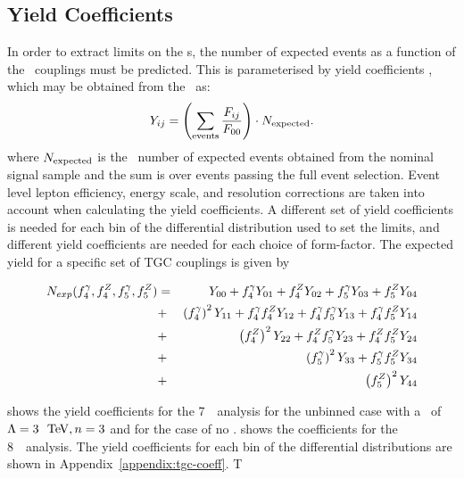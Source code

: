 \subsection{Yield Coefficients}

In order to extract limits on the \TGC s, the number of expected events as a
function of the \TGC\ couplings must be predicted. This is parameterised by
yield coefficients \Yij, which may be obtained from the \Fij\ as:
\begin{equation}
Y_{ij} = \left( \sum_{\rm events} \frac{F_{ij}}{F_{00} } \right) \cdot{N_{\rm expected}}.
\end{equation}
where $N_{\rm expected}$ is the \sm\ number of expected events obtained from the
nominal signal sample and the sum is over events passing the full event
selection. Event level lepton efficiency, energy scale, and resolution corrections
are taken into account when calculating the yield coefficients. A different set of yield
coefficients is needed for each bin of the differential distribution used to set
the limits, and different yield coefficients are needed for each choice of
form-factor. The expected yield for a specific set of TGC couplings is given by

\begin{eqnarray}\label{eqn:Nexp_TGC}
N_{exp} (f_{4}^{\gamma}, f_{4}^{Z}, f_{5}^{\gamma}, f_{5}^{Z}) & = & Y_{00} + f_4^\gamma Y_{01} + f_4^Z Y_{02} + f_5^\gamma Y_{03} + f_5^Z Y_{04}  \nonumber \\
&+& \left(f_4^\gamma\right)^2Y_{11} + f_4^\gamma f_4^Z Y_{12} +  f_4^\gamma f_5^\gamma Y_{13} + f_4^\gamma f_5^Z Y_{14}  \nonumber \\
&+& \left(f_4^Z\right)^2Y_{22} + f_4^Zf_5^\gamma Y_{23} + f_4^Zf_5^Z Y_{24}  \nonumber \\
&+& \left(f_5^\gamma\right)^2Y_{33} + f_5^\gamma f_5^Z Y_{34} \nonumber \\
&+& \left(f_5^Z\right)^2Y_{44}
\end{eqnarray}

 shows the yield coefficients for the 7~\tev\ analysis for the
unbinned case with a \formfactor\ of $\Lambda=3~\tev, n=3$ and for the case of
no \formfactor. shows the coefficients for the 8~\tev\
analysis. The yield coefficients for each bin of the differential distributions
are shown in Appendix~\ref{appendix:tgc-coeff}. T

